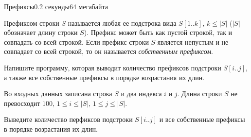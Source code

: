 \begin{problem}{Префиксы}{}{}{0.2 секунды}{64 мегабайта}

Префиксом строки $S$ называется любая ее подстрока вида $S[1..k]$, $k \le |S|$ 
($|S|$ обозначает длину строки $S$). 
Префикс может быть как пустой строкой, так и совпадать со всей строкой.
Если префикс строки $S$ является непустым и не совпадает со всей строкой, 
то он называется {\it собственным префиксом}. 

Напишите программу, которая выводит количество префиксов подстроки $S[i..j]$, а также 
все собственные префиксы в порядке возрастания их длин.

\InputFile
Во входных данных записана строка $S$ и два индекса $i$ и $j$. Длина строки $S$ не превосходит $100$, $1 \le i \le |S|$, $1 \le j \le |S|$.

\OutputFile
Выведите количество перфиксов подстроки $S[i..j]$
и все собственные префиксы в порядке возрастания их длин.

\Examples

\begin{example}
%
%
\end{example}

\end{problem}
